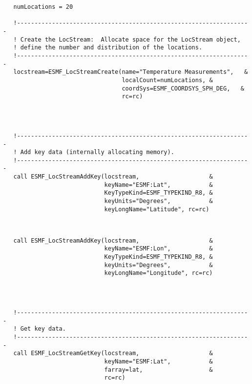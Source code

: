 
 \begin{verbatim}
   numLocations = 20

   !-------------------------------------------------------------------
   ! Create the LocStream:  Allocate space for the LocStream object, 
   ! define the number and distribution of the locations. 
   !-------------------------------------------------------------------
   locstream=ESMF_LocStreamCreate(name="Temperature Measurements",   &
                                  localCount=numLocations, &
                                  coordSys=ESMF_COORDSYS_SPH_DEG,   &
                                  rc=rc)
 
\end{verbatim}
 

 \begin{verbatim}


   !-------------------------------------------------------------------
   ! Add key data (internally allocating memory).
   !-------------------------------------------------------------------
   call ESMF_LocStreamAddKey(locstream,                    &
                             keyName="ESMF:Lat",           &
                             KeyTypeKind=ESMF_TYPEKIND_R8, &
                             keyUnits="Degrees",           &
                             keyLongName="Latitude", rc=rc)
 
\end{verbatim}
 

 \begin{verbatim}

   call ESMF_LocStreamAddKey(locstream,                    &
                             keyName="ESMF:Lon",           &
                             KeyTypeKind=ESMF_TYPEKIND_R8, &
                             keyUnits="Degrees",           &
                             keyLongName="Longitude", rc=rc)

 
\end{verbatim}
 

 \begin{verbatim}

   !-------------------------------------------------------------------
   ! Get key data. 
   !-------------------------------------------------------------------
   call ESMF_LocStreamGetKey(locstream,                    &
                             keyName="ESMF:Lat",           &
                             farray=lat,                   &
                             rc=rc)
 
\end{verbatim}
 
